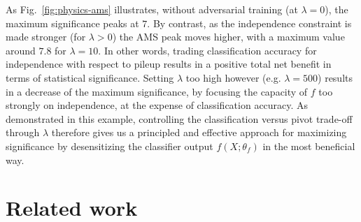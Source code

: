\documentclass[twocolumn,superscriptaddress,aps]{revtex4-1}
\theoremstyle{plain}
\begin{document}
As  Fig.~\ref{fig:physics-ams} illustrates, without adversarial training (at
$\lambda=0$), the maximum significance peaks at $7$. By contrast, as the
independence constraint is made stronger (for $\lambda > 0$) the AMS peak moves
higher, with a maximum value around  $7.8$ for $\lambda=10$. In other words,
trading classification accuracy for independence with respect to pileup results
in a positive total net benefit in terms of statistical significance. Setting
$\lambda$ too high however (e.g. $\lambda=500$) results in a decrease of the
maximum significance, by focusing the capacity of $f$ too strongly on
independence, at the expense of classification accuracy. As demonstrated in this
example, controlling the classification versus pivot trade-off through $\lambda$
therefore gives us a principled and effective approach for maximizing
significance by desensitizing the classifier output $f(X;\theta_f)$ in the most
beneficial way.



\section{Related work}
\end{document}
